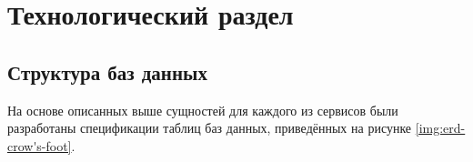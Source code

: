 

\chapter{Технологический раздел}

\section{Структура баз данных}

На основе описанных выше сущностей для каждого из сервисов были разработаны спецификации таблиц баз данных, приведённых на рисунке \ref{img:erd-crow's-foot}.

